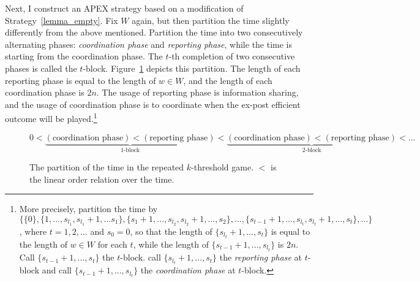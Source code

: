 \documentclass[12pt,letter]{article}
\theoremstyle{definition}
\theoremstyle{remark}
\theoremstyle{claim}
\begin{document}
Next, I construct an APEX strategy based on a modification of Strategy~\ref{lemma_empty}. Fix $W$ again, but then partition the time slightly differently from the above mentioned. Partition the time into two consecutively alternating phases: \textit{coordination phase} and \textit{reporting phase}, while the time is starting from the coordination phase. The $t$-th completion of two consecutive phases is called the $t$-block. Figure~\ref{fig:ordered_original_game_intro} depicts this partition. The length of each reporting phase is equal to the length of $w\in W$, and the length of each coordination phase is $2n$. The usage of reporting phase is information sharing, and the usage of coordination phase is to coordinate when the ex-post efficient outcome will be played.\footnote{More precisely, partition the time by $\{\{0\},\{1,...,s_{l_1},s_{l_1}+1,...s_1\},\{s_1+1,...,s_{l_2},s_{l_2}+1,...,s_2\},...,\{s_{t-1}+1,...,s_{l_{t}},s_{l_t}+1,...,s_t\},...\}$, where $t=1,2,...$ and $s_{0}=0$, so that the length of $\{s_{l_t}+1,...,s_t\}$ is equal to the length of $w\in W$ for each $t$, while the length of $\{s_{t-1}+1,...,s_{l_t}\}$ is $2n$. Call $\{s_{t-1}+1,...,s_t\}$ the $t$-block. call $\{s_{l_t}+1,...,s_t\}$ the \textit{reporting phase} at $t$-block and call $\{s_{t-1}+1,...,s_{l_t}\}$ the \textit{coordination phase} at $t$-block.}
\begin{figure}
\[0<\underbrace{(\text{coordination phase})<(\text{reporting phase})}_{\text{$1$-block}}<\underbrace{(\text{coordination phase})<(\text{reporting phase})}_{\text{$2$-block}}<...\]
\caption{The partition of the time in the repeated $k$-threshold game. $<$ is the linear order relation over the time.}
\label{fig:ordered_original_game_intro}
\end{figure}
\end{document}
